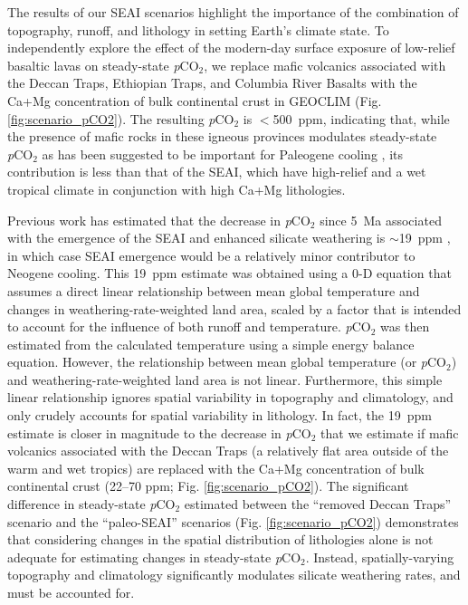 \documentclass[9pt,twocolumn,twoside,lineno]{pnas-new}
\newcommand{\pCOtwo}{\textit{p}CO$_{2}$\xspace}
\begin{document}
The results of our SEAI scenarios highlight the importance of the combination of topography, runoff, and lithology in setting Earth's climate state. To independently explore the effect of the modern-day surface exposure of low-relief basaltic lavas on steady-state \pCOtwo \cite{Kent2013a}, we replace mafic volcanics associated with the Deccan Traps, Ethiopian Traps, and Columbia River Basalts with the Ca+Mg concentration of bulk continental crust in GEOCLIM (Fig. \ref{fig:scenario_pCO2}). The resulting \pCOtwo is $<$500~ppm, indicating that, while the presence of mafic rocks in these igneous provinces modulates steady-state \pCOtwo as has been suggested to be important for Paleogene cooling \cite{Kent2013a}, its contribution is less than that of the SEAI, which have high-relief and a wet tropical climate in conjunction with high Ca+Mg lithologies.

Previous work has estimated that the decrease in \pCOtwo since 5~Ma associated with the emergence of the SEAI and enhanced silicate weathering is $\sim$19~ppm \cite{Molnar2015a}, in which case SEAI emergence would be a relatively minor contributor to Neogene cooling. This 19~ppm estimate was obtained using a 0-D equation that assumes a direct linear relationship between mean global temperature and changes in weathering-rate-weighted land area, scaled by a factor that is intended to account for the influence of both runoff and temperature. \pCOtwo was then estimated from the calculated temperature using a simple energy balance equation. However, the relationship between mean global temperature (or \pCOtwo) and weathering-rate-weighted land area is not linear. Furthermore, this simple linear relationship ignores spatial variability in topography and climatology, and only crudely accounts for spatial variability in lithology. In fact, the 19~ppm estimate is closer in magnitude to the decrease in \pCOtwo that we estimate if mafic volcanics associated with the Deccan Traps (a relatively flat area outside of the warm and wet tropics) are replaced with the Ca+Mg concentration of bulk continental crust (22--70 ppm; Fig. \ref{fig:scenario_pCO2}). The significant difference in steady-state \pCOtwo estimated between the ``removed Deccan Traps'' scenario and the ``paleo-SEAI'' scenarios (Fig. \ref{fig:scenario_pCO2}) demonstrates that considering changes in the spatial distribution of lithologies alone is not adequate for estimating changes in steady-state \pCOtwo. Instead, spatially-varying topography and climatology significantly modulates silicate weathering rates, and must be accounted for.
\end{document}
